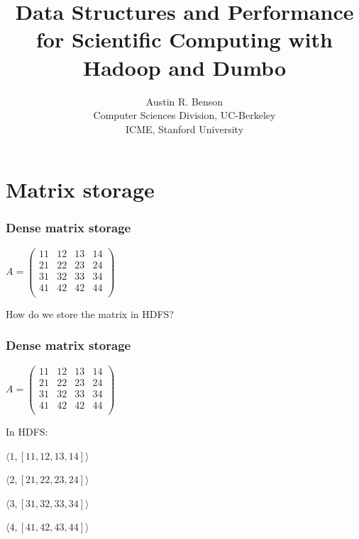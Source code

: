 \documentclass{beamer}
\title{Data Structures and Performance for Scientific Computing with Hadoop and Dumbo}
\author{Austin R. Benson \\
\vspace{0.2in}
Computer Sciences Division, UC-Berkeley \\
ICME, Stanford University}
\begin{document}
\maketitle

\section{Matrix storage}


\begin{frame}
\frametitle{Dense matrix storage}

\begin{center}
$A = \begin{pmatrix}
11 & 12 & 13 & 14 \\
21 & 22 & 23 & 24 \\
31 & 32 & 33 & 34 \\
41 & 42 & 42 & 44 \\
\end{pmatrix}$
\end{center}

\vspace{0.2in}

How do we store the matrix in HDFS?

\end{frame}

\begin{frame}
\frametitle{Dense matrix storage}

\begin{center}
$A = \begin{pmatrix}
11 & 12 & 13 & 14 \\
21 & 22 & 23 & 24 \\
31 & 32 & 33 & 34 \\
41 & 42 & 42 & 44 \\
\end{pmatrix}$
\end{center}

\vspace{0.2in}

In HDFS: 

\begin{center}

$\langle 1, [11,  12, 13, 14] \rangle$

\vspace{0.1in}

$\langle 2, [21, 22, 23, 24] \rangle$

\vspace{0.1in}

$\langle 3, [31, 32, 33, 34] \rangle$

\vspace{0.1in}

$\langle 4, [41, 42, 43, 44] \rangle$

\end{center}

\end{frame}
\end{document}

